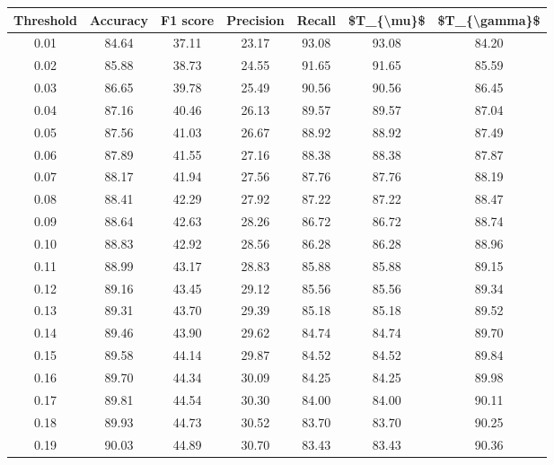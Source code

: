 \begin{tabular}{|c|c|c|c|c|c|c|}
\hline
 Threshold &  Accuracy &  F1 score &  Precision &  Recall &  \$T\_\{\textbackslash mu\}\$ &  \$T\_\{\textbackslash gamma\}\$ \\
\hline
      0.01 &     84.64 &     37.11 &      23.17 &   93.08 &      93.08 &         84.20 \\
      0.02 &     85.88 &     38.73 &      24.55 &   91.65 &      91.65 &         85.59 \\
      0.03 &     86.65 &     39.78 &      25.49 &   90.56 &      90.56 &         86.45 \\
      0.04 &     87.16 &     40.46 &      26.13 &   89.57 &      89.57 &         87.04 \\
      0.05 &     87.56 &     41.03 &      26.67 &   88.92 &      88.92 &         87.49 \\
      0.06 &     87.89 &     41.55 &      27.16 &   88.38 &      88.38 &         87.87 \\
      0.07 &     88.17 &     41.94 &      27.56 &   87.76 &      87.76 &         88.19 \\
      0.08 &     88.41 &     42.29 &      27.92 &   87.22 &      87.22 &         88.47 \\
      0.09 &     88.64 &     42.63 &      28.26 &   86.72 &      86.72 &         88.74 \\
      0.10 &     88.83 &     42.92 &      28.56 &   86.28 &      86.28 &         88.96 \\
      0.11 &     88.99 &     43.17 &      28.83 &   85.88 &      85.88 &         89.15 \\
      0.12 &     89.16 &     43.45 &      29.12 &   85.56 &      85.56 &         89.34 \\
      0.13 &     89.31 &     43.70 &      29.39 &   85.18 &      85.18 &         89.52 \\
      0.14 &     89.46 &     43.90 &      29.62 &   84.74 &      84.74 &         89.70 \\
      0.15 &     89.58 &     44.14 &      29.87 &   84.52 &      84.52 &         89.84 \\
      0.16 &     89.70 &     44.34 &      30.09 &   84.25 &      84.25 &         89.98 \\
      0.17 &     89.81 &     44.54 &      30.30 &   84.00 &      84.00 &         90.11 \\
      0.18 &     89.93 &     44.73 &      30.52 &   83.70 &      83.70 &         90.25 \\
      0.19 &     90.03 &     44.89 &      30.70 &   83.43 &      83.43 &         90.36 \\

\end{tabular}

